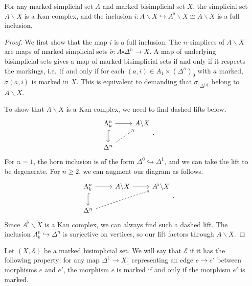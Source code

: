 \documentclass[main.tex]{subfiles}
\begin{document}
\begin{lemma}
  For any marked simplicial set $A$ and marked bisimplicial set $X$, the simplicial set $A \backslash X$ is a Kan complex, and the inclusion $i\colon A \backslash X \hookrightarrow A^{\flat} \backslash X \cong \mathring{A} \backslash \mathring{X}$ is a full inclusion.
\end{lemma}
\begin{proof}
  We first show that the map $i$ is a full inclusion. The $n$-simplices of $A \backslash X$ are maps of marked simplicial sets $\tilde{\sigma}\colon A \square \Delta^{n} \to X$. A map of underlying bisimplicial sets gives a map of marked bisimplicial sets if and only if it respects the markings, i.e.\ if and only if for each $(a, i) \in A_{1} \times (\Delta^{n})_{0}$ with $a$ marked, $\tilde{\sigma}(a, i)$ is marked in $X$. This is equivalent to demanding that $\sigma|_{\Delta^{\{i\}}}$ belong to $A \backslash X$.

  To show that $A \backslash X$ is a Kan complex, we need to find dashed lifts below.
  \begin{equation*}
    \begin{tikzcd}
      \Lambda^{n}_{k}
      \arrow[r]
      \arrow[d, hook]
      & A \backslash X
      \\
      \Delta^{n}
      \arrow[ur, dashed]
    \end{tikzcd}.
  \end{equation*}
  For $n = 1$, the horn inclusion is of the form $\Delta^{0} \hookrightarrow \Delta^{1}$, and we can take the lift to be degenerate. For $n \geq 2$, we can augment our diagram as follows.
  \begin{equation*}
    \begin{tikzcd}
      \Lambda^{n}_{k}
      \arrow[r]
      \arrow[d, hook]
      & A \backslash X
      \arrow[r]
      & A^{\flat} \backslash X
      \\
      \Delta^{n}
      \arrow[urr, dashed]
    \end{tikzcd}.
  \end{equation*}
  Since $A^{\flat} \backslash X$ is a Kan complex, we can always find such a dashed lift. The inclusion $\Lambda^{n}_{k} \hookrightarrow \Delta^{n}$ is surjective on vertices, so our lift factors through $A \backslash X$.
\end{proof}

\begin{definition}
  Let $(X, \mathcal{E})$ be a marked bisimplicial set. We will say that $\mathcal{E}$  if it has the following property: for any map $\Delta^{1} \to X_{1}$ representing an edge $e \to e'$ between morphisms $e$ and $e'$, the morphism $e$ is marked if and only if the morphism $e'$ is marked.
\end{definition}
\end{document}
